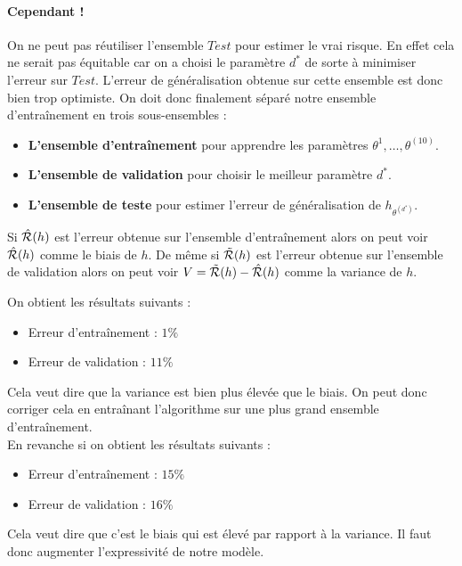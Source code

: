 \paragraph{Cependant !} On ne peut pas réutiliser l'ensemble $Test$ pour estimer le vrai risque. En effet cela ne serait pas équitable car on a choisi le paramètre $d^*$ de sorte à minimiser l'erreur sur $Test$. L'erreur de généralisation obtenue sur cette ensemble est donc bien trop optimiste.	On doit donc finalement séparé notre ensemble d'entraînement en trois sous-ensembles :
\begin{itemize}
	\item \textbf{L'ensemble d'entraînement} pour apprendre les paramètres $\theta^{1}, \dots, \theta^{(10)}$.
	\item \textbf{L'ensemble de validation} pour choisir le meilleur paramètre $d^*$.
	\item \textbf{L'ensemble de teste} pour estimer l'erreur de généralisation de $h_{\theta^{(d^*)}}$.
\end{itemize}
Si $\hat{\mathcal{R}}(h)$ est l'erreur obtenue sur l'ensemble d'entraînement alors on peut voir $\hat{\mathcal{R}}(h)$ comme le biais de $h$. De même si $\tilde{\mathcal{R}}(h)$ est l'erreur obtenue sur l'ensemble de validation alors on peut voir $V = \tilde{\mathcal{R}}(h) - \hat{\mathcal{R}}(h)$ comme la variance de $h$.

\exe
On obtient les résultats suivants :
\begin{itemize}
	\item Erreur d'entraînement : $1\%$
	\item Erreur de validation : $11\%$
\end{itemize}
Cela veut dire que la variance est bien plus élevée que le biais. On peut donc corriger cela en entraînant l'algorithme sur une plus grand ensemble d'entraînement. \\
En revanche si on obtient les résultats suivants :
\begin{itemize}
	\item Erreur d'entraînement : $15\%$
	\item Erreur de validation : $16\%$
\end{itemize}
Cela veut dire que c'est le biais qui est élevé par rapport à la variance. Il faut donc augmenter l'expressivité de notre modèle.